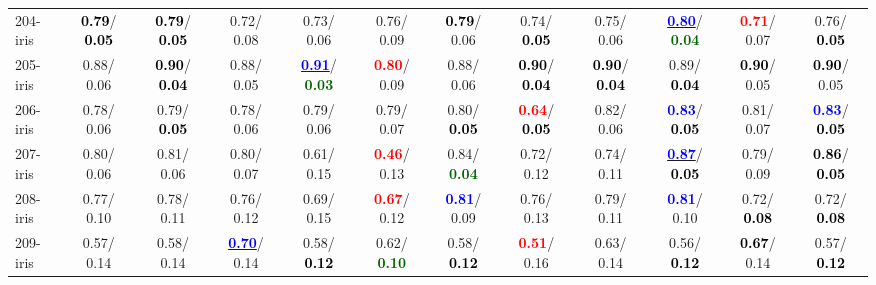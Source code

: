 \begin{table}[h]
\begin{center}
{\begin{tabular}{lc|c|c|c|c|c|c|c|c|c|c}
204-iris & \textcolor{black}{\textbf{  0.79}}/\textcolor{black}{\textbf{  0.05}} & \textcolor{black}{\textbf{  0.79}}/\textcolor{black}{\textbf{  0.05}} &   0.72/  0.08 &   0.73/  0.06 &   0.76/  0.09 & \textcolor{black}{\textbf{  0.79}}/  0.06 &   0.74/\textcolor{black}{\textbf{  0.05}} &   0.75/  0.06 & \underline{\textcolor{blue}{\textbf{  0.80}}}/\textcolor{darkgreen}{\textbf{  0.04}} & \textcolor{red}{\textbf{  0.71}}/  0.07 &   0.76/\textcolor{black}{\textbf{  0.05}} \\
205-iris &   0.88/  0.06 & \textcolor{black}{\textbf{  0.90}}/\textcolor{black}{\textbf{  0.04}} &   0.88/  0.05 & \underline{\textcolor{blue}{\textbf{  0.91}}}/\textcolor{darkgreen}{\textbf{  0.03}} & \textcolor{red}{\textbf{  0.80}}/  0.09 &   0.88/  0.06 & \textcolor{black}{\textbf{  0.90}}/\textcolor{black}{\textbf{  0.04}} & \textcolor{black}{\textbf{  0.90}}/\textcolor{black}{\textbf{  0.04}} &   0.89/\textcolor{black}{\textbf{  0.04}} & \textcolor{black}{\textbf{  0.90}}/  0.05 & \textcolor{black}{\textbf{  0.90}}/  0.05 \\
206-iris &   0.78/  0.06 &   0.79/\textcolor{black}{\textbf{  0.05}} &   0.78/  0.06 &   0.79/  0.06 &   0.79/  0.07 &   0.80/\textcolor{black}{\textbf{  0.05}} & \textcolor{red}{\textbf{  0.64}}/\textcolor{black}{\textbf{  0.05}} &   0.82/  0.06 & \textcolor{blue}{\textbf{  0.83}}/\textcolor{black}{\textbf{  0.05}} &   0.81/  0.07 & \textcolor{blue}{\textbf{  0.83}}/\textcolor{black}{\textbf{  0.05}} \\ \hline
207-iris &   0.80/  0.06 &   0.81/  0.06 &   0.80/  0.07 &   0.61/  0.15 & \textcolor{red}{\textbf{  0.46}}/  0.13 &   0.84/\textcolor{darkgreen}{\textbf{  0.04}} &   0.72/  0.12 &   0.74/  0.11 & \underline{\textcolor{blue}{\textbf{  0.87}}}/\textcolor{black}{\textbf{  0.05}} &   0.79/  0.09 & \textcolor{black}{\textbf{  0.86}}/\textcolor{black}{\textbf{  0.05}} \\
208-iris &   0.77/  0.10 &   0.78/  0.11 &   0.76/  0.12 &   0.69/  0.15 & \textcolor{red}{\textbf{  0.67}}/  0.12 & \textcolor{blue}{\textbf{  0.81}}/  0.09 &   0.76/  0.13 &   0.79/  0.11 & \textcolor{blue}{\textbf{  0.81}}/  0.10 &   0.72/\textcolor{black}{\textbf{  0.08}} &   0.72/\textcolor{black}{\textbf{  0.08}} \\
209-iris &   0.57/  0.14 &   0.58/  0.14 & \underline{\textcolor{blue}{\textbf{  0.70}}}/  0.14 &   0.58/\textcolor{black}{\textbf{  0.12}} &   0.62/\textcolor{darkgreen}{\textbf{  0.10}} &   0.58/\textcolor{black}{\textbf{  0.12}} & \textcolor{red}{\textbf{  0.51}}/  0.16 &   0.63/  0.14 &   0.56/\textcolor{black}{\textbf{  0.12}} & \textcolor{black}{\textbf{  0.67}}/  0.14 &   0.57/\textcolor{black}{\textbf{  0.12}} \\

\end{tabular}}
\end{center}
\end{table}
